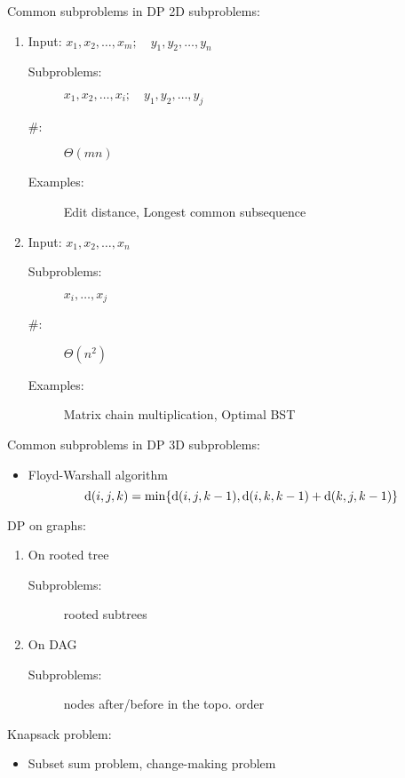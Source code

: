 \begin{frame}{Common subproblems in DP}
  2D subproblems:
  \begin{enumerate}
	\item Input: $x_{1}, x_{2}, \dots, x_{m}; \quad y_{1}, y_{2}, \dots, y_{n}$
	  \begin{description}
		\item[Subproblems:] $x_{1}, x_{2}, \dots, x_{i}; \quad y_{1}, y_{2}, \dots, y_{j}$
		\item[\#:] $\Theta(mn)$
		  \pause
		\item[Examples:] Edit distance, Longest common subsequence
	  \end{description}
	  \pause
	  \vspace{0.30cm}
	\item Input: $x_{1}, x_{2}, \dots, x_{n}$
	  \begin{description}
		\item[Subproblems:] $x_{i}, \dots, x_{j}$
		\item[\#:] $\Theta(n^{2})$
		  \pause
		\item[Examples:] Matrix chain multiplication, Optimal BST
	  \end{description}
  \end{enumerate}
\end{frame}
\begin{frame}{Common subproblems in DP}
  3D subproblems:
  \begin{itemize}
	\item Floyd-Warshall algorithm
	  \[
		\text{d}(i,j,k) = \min \{\text{d}(i,j,k-1), \text{d}(i,k,k-1) + \text{d}(k,j,k-1)\}
	  \]
  \end{itemize}

  \pause
  DP on graphs:
  \begin{enumerate}
	\item On rooted tree
	  \begin{description}
		\item[Subproblems:] rooted subtrees
	  \end{description}
	\item On DAG
	  \begin{description}
		\item[Subproblems:] nodes after/before in the topo. order
	  \end{description}
  \end{enumerate}

  \pause
  \vspace{0.30cm}
  Knapsack problem:
  \begin{itemize}
	\item Subset sum problem, change-making problem
  \end{itemize}
\end{frame}
